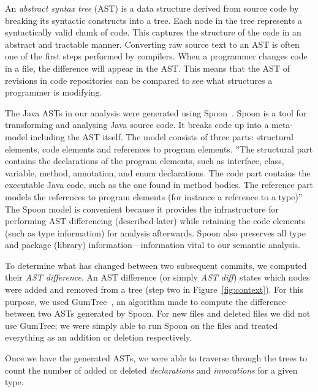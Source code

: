 \documentclass[conference]{IEEEtran}
\begin{document}
An \emph{abstract syntax tree} (AST) is a data structure derived from source code by breaking its syntactic constructs into a tree. Each node in the tree represents a syntactically valid chunk of code. This captures the structure of the code in an abstract and tractable manner. Converting raw source text to an AST is often one of the first steps performed by compilers. When a programmer changes code in a file, the difference will appear in the AST. This means that the AST of revisions in code repositories can be compared to see what structures a programmer is modifying.

The Java ASTs in our analysis were generated using Spoon~\cite{pawlak:hal-01169705}. Spoon is a tool for transforming and analysing Java source code. It breaks code up into a meta-model including the AST itself. The model consists of three parts: structural elements, code elements and references to program elements. ''The structural part contains the declarations of the program elements, such as interface, class, variable, method, annotation, and enum declarations.  The code part contains the executable Java code, such as the one found in method bodies.  The reference part models the references to program elements (for instance a reference to a type)'' \cite{pawlak:hal-01169705} The Spoon model is convenient because it provides the infrastructure for performing AST differencing (described later) while retaining the code elements (such as type information) for analysis afterwards. Spoon also preserves all type and package (library) information—information vital to our semantic analysis.

To determine what has changed between two subsequent commits, we computed their \emph{AST difference}. An AST difference (or simply \emph{AST diff}) states which nodes were added and removed from a tree (step two in Figure~\ref{fig:context}). For this purpose, we used GumTree~\cite{falleri:hal-01054552}, an algorithm made to compute the difference between two ASTs generated by Spoon. For new files and deleted files we did not use GumTree; we were simply able to run Spoon on the files and treated everything as an addition or deletion respectively.

Once we have the generated ASTs, we were able to traverse through the trees to count the number of added or deleted \emph{declarations} and \emph{invocations} for a given type. 
\end{document}
